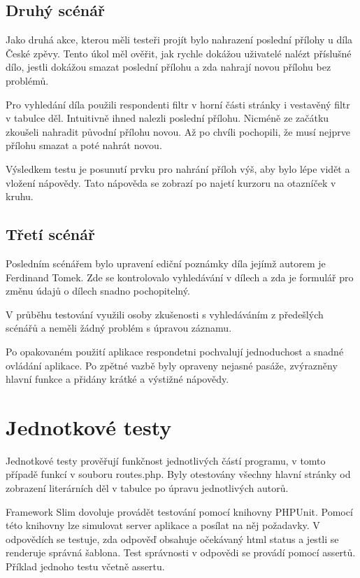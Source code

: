         \subsection{Druhý scénář}
            Jako druhá akce, kterou měli testeři projít bylo nahrazení poslední přílohy u díla České zpěvy. Tento úkol měl ověřit, jak rychle dokážou uživatelé nalézt příslušné dílo, jestli dokážou smazat poslední přílohu a zda nahrají novou přílohu bez problémů.
            
            Pro vyhledání díla použili respondenti filtr v horní části stránky i vestavěný filtr v tabulce děl. Intuitivně ihned nalezli poslední přílohu. Nicméně ze začátku zkoušeli nahradit původní přílohu novou. Až po chvíli pochopili, že musí nejprve přílohu smazat a poté nahrát novou.

            Výsledkem testu je posunutí prvku pro nahrání příloh výš, aby bylo lépe vidět a vložení nápovědy. Tato nápověda se zobrazí po najetí kurzoru na otazníček v kruhu.

        \subsection{Třetí scénář}
            Posledním scénářem bylo upravení ediční poznámky díla jejímž autorem je Ferdinand Tomek. Zde se kontrolovalo vyhledávání v dílech a zda je formulář pro změnu údajů o dílech snadno pochopitelný.
            
            V průběhu testování využili osoby zkušenosti s vyhledáváním z předešlých scénářů a neměli žádný problém s úpravou záznamu. 
            
            Po opakovaném použití aplikace respondetni pochvalují jednoduchost a snadné ovládání aplikace. Po zpětné vazbě byly opraveny nejasné pasáže, zvýrazněny hlavní funkce a přidány krátké a výstižné nápovědy.

    \section{Jednotkové testy}
        Jednotkové testy prověřují funkčnost jednotlivých částí programu, v tomto případě funkcí v souboru routes.php. Byly otestovány všechny hlavní stránky od zobrazení literárních děl v tabulce po úpravu jednotlivých autorů.
        
        Framework Slim dovoluje provádět testování pomocí knihovny PHPUnit. Pomocí této knihovny lze simulovat server aplikace a posílat na něj požadavky. V odpovědích se testuje, zda odpověď obsahuje očekávaný html status a jestli se renderuje správná šablona. Test správnosti v odpovědi se provádí pomocí assertů. Příklad jednoho testu včetně assertu.
        
